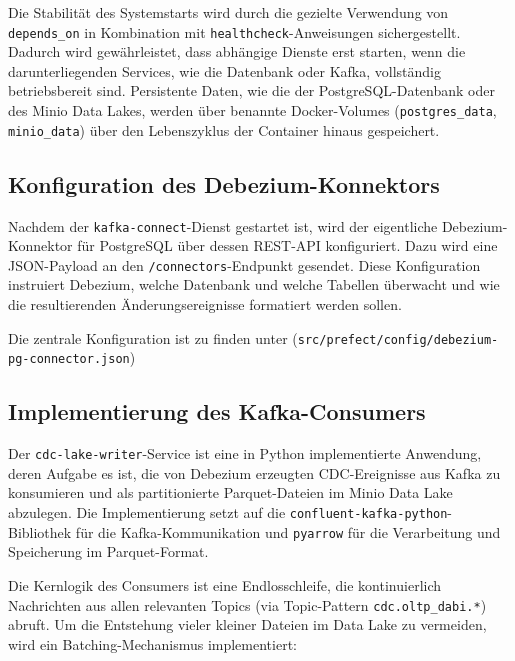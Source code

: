 \documentclass[
    12pt,               
    a4paper,        
    ngerman            
]{scrartcl}
\begin{document}
Die Stabilität des Systemstarts wird durch die gezielte Verwendung von \texttt{depends\_on} in Kombination mit \texttt{healthcheck}-Anweisungen sichergestellt. Dadurch wird gewährleistet, dass abhängige Dienste erst starten, wenn die darunterliegenden Services, wie die Datenbank oder Kafka, vollständig betriebsbereit sind. Persistente Daten, wie die der PostgreSQL-Datenbank oder des Minio Data Lakes, werden über benannte Docker-Volumes (\texttt{postgres\_data}, \texttt{minio\_data}) über den Lebenszyklus der Container hinaus gespeichert.

\subsection{Konfiguration des Debezium-Konnektors}
\label{sec:debezium_konfiguration}

Nachdem der \texttt{kafka-connect}-Dienst gestartet ist, wird der eigentliche Debezium-Konnektor für PostgreSQL über dessen REST-API konfiguriert. Dazu wird eine JSON-Payload an den \texttt{/connectors}-Endpunkt gesendet. Diese Konfiguration instruiert Debezium, welche Datenbank und welche Tabellen überwacht und wie die resultierenden Änderungsereignisse formatiert werden sollen.

Die zentrale Konfiguration ist zu finden unter (\texttt{src/prefect/config/debezium-pg-connector.json})

\subsection{Implementierung des Kafka-Consumers}
\label{sec:kafka_consumer}

Der \texttt{cdc-lake-writer}-Service ist eine in Python implementierte Anwendung, deren Aufgabe es ist, die von Debezium erzeugten CDC-Ereignisse aus Kafka zu konsumieren und als partitionierte Parquet-Dateien im Minio Data Lake abzulegen. Die Implementierung setzt auf die \texttt{confluent-kafka-python}-Bibliothek für die Kafka-Kommunikation und \texttt{pyarrow} für die Verarbeitung und Speicherung im Parquet-Format.

Die Kernlogik des Consumers ist eine Endlosschleife, die kontinuierlich Nachrichten aus allen relevanten Topics (via Topic-Pattern \texttt{cdc.oltp\_dabi.*}) abruft. Um die Entstehung vieler kleiner Dateien im Data Lake zu vermeiden, wird ein Batching-Mechanismus implementiert:
\end{document}
